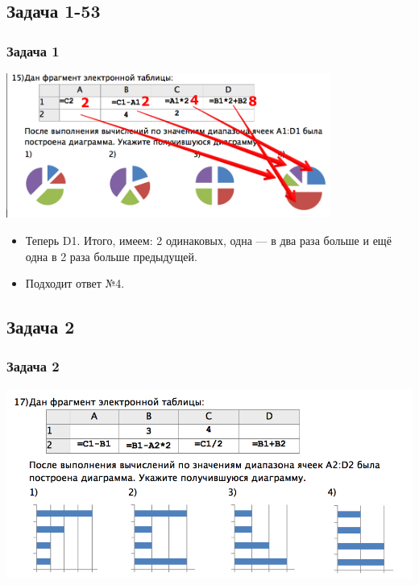 \documentclass[compress,red]{beamer}
\begin{document}
\subsection{Задача 1-53}
\begin{frame}[fragile]
  \frametitle{Задача 1}
  \centerline{\includegraphics[width=0.8\textwidth]{images/07-4.png}}
  \begin{itemize}
      \item Теперь D1. Итого, имеем: 2 одинаковых, одна --- в два раза больше и ещё одна в 2 раза больше предыдущей.
      \item Подходит ответ №4.
  \end{itemize}
\end{frame}

\subsection{Задача 2}
\begin{frame}[fragile]
  \frametitle{Задача 2}
  \centerline{\includegraphics[width=1.0\textwidth]{images/08.png}}
\end{frame}
\end{document}
